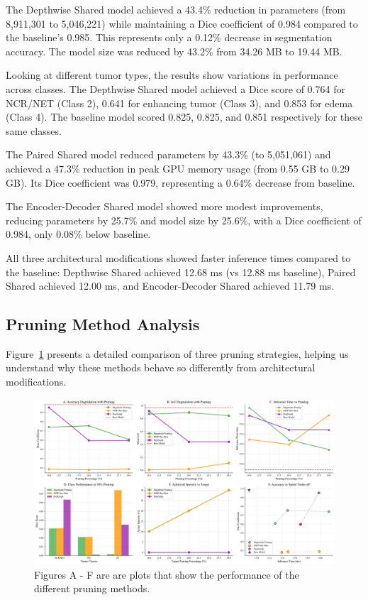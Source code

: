 \documentclass[12pt,a4paper]{article}
\begin{document}
\begin{enumerate}
The Depthwise Shared model achieved a 43.4\% reduction in parameters (from 8,911,301 to 5,046,221) while maintaining a Dice coefficient of 0.984 compared to the baseline's 0.985. This represents only a 0.12\% decrease in segmentation accuracy. The model size was reduced by 43.2\% from 34.26 MB to 19.44 MB.

Looking at different tumor types, the results show variations in performance across classes. The Depthwise Shared model achieved a Dice score of 0.764 for NCR/NET (Class 2), 0.641 for enhancing tumor (Class 3), and 0.853 for edema (Class 4). The baseline model scored 0.825, 0.825, and 0.851 respectively for these same classes.

The Paired Shared model reduced parameters by 43.3\% (to 5,051,061) and achieved a 47.3\% reduction in peak GPU memory usage (from 0.55 GB to 0.29 GB). Its Dice coefficient was 0.979, representing a 0.64\% decrease from baseline.

The Encoder-Decoder Shared model showed more modest improvements, reducing parameters by 25.7\% and model size by 25.6\%, with a Dice coefficient of 0.984, only 0.08\% below baseline.

All three architectural modifications showed faster inference times compared to the baseline: Depthwise Shared achieved 12.68 ms (vs 12.88 ms baseline), Paired Shared achieved 12.00 ms, and Encoder-Decoder Shared achieved 11.79 ms.

\subsection{Pruning Method Analysis}

Figure~\ref{fig:pruning_analysis} presents a detailed comparison of three pruning strategies, helping us understand why these methods behave so differently from architectural modifications.

\begin{figure}[H]
\centering
\includegraphics[width=\textwidth]{pruning_analysis.pdf}
\caption{ Figures A - F are are plots that show the performance of the different pruning methods.}
\label{fig:pruning_analysis}
\end{figure}


\end{enumerate}
\end{document}
